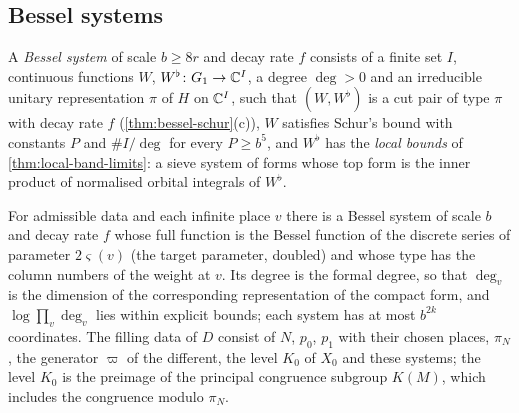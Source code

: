 \subsection{Bessel systems}\label{ss:bessel-systems}

\begin{definition}\label{def:bessel-system}
A \emph{Bessel system} of scale $b\ge8r$ and decay rate $f$ consists of a finite set $I$, continuous functions $W$, $W^\flat\colon G_1\to\mathbb{C}^I$, a degree $\deg>0$ and an irreducible
unitary representation $\pi$ of $H$ on $\mathbb{C}^I$, such that $(W,W^\flat)$ is a cut pair of type $\pi$ with decay rate $f$ (\cref{thm:bessel-schur}(c)), $W$ satisfies Schur's bound with
constants $P$ and $\#I/\deg$ for every $P\ge b^5$, and $W^\flat$ has the \emph{local bounds} of \cref{thm:local-band-limits}: a sieve system of forms whose top form is the inner product
of normalised orbital integrals of $W^\flat$.
\end{definition}

\begin{theorem}\label{thm:bessel-systems-exist}
For admissible data and each infinite place $v$ there is a Bessel system of scale $b$ and decay rate $f$ whose full function is the Bessel function of the discrete series of
parameter $2\varsigma(v)$ (the target parameter, doubled) and whose type has the column numbers of the weight at $v$. Its degree is the formal degree, so that
$\deg_v$ is the dimension of the corresponding representation of the compact form, and $\log\prod_v\deg_v$ lies within explicit bounds; each system has at most $b^{2k}$
coordinates. The filling data of $D$ consist of $N$, $p_0$, $p_1$ with their chosen places, $\pi_N$, the generator $\varpi$ of the different, the level $K_0$ of $X_0$ and these
systems; the level $K_0$ is the preimage of the principal congruence subgroup $K(M)$, which includes the congruence modulo $\pi_N$.
\end{theorem}

